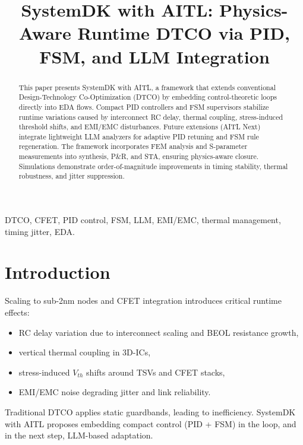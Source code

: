 \documentclass[conference]{IEEEtran}
\begin{document}
\title{SystemDK with AITL: Physics-Aware Runtime DTCO via PID, FSM, and LLM Integration}

\author{
}

\maketitle

\begin{abstract}
This paper presents SystemDK with AITL, a framework that extends conventional Design-Technology Co-Optimization (DTCO) by embedding control-theoretic loops directly into EDA flows. Compact PID controllers and FSM supervisors stabilize runtime variations caused by interconnect RC delay, thermal coupling, stress-induced threshold shifts, and EMI/EMC disturbances. Future extensions (AITL Next) integrate lightweight LLM analyzers for adaptive PID retuning and FSM rule regeneration. The framework incorporates FEM analysis and S-parameter measurements into synthesis, P\&R, and STA, ensuring physics-aware closure. Simulations demonstrate order-of-magnitude improvements in timing stability, thermal robustness, and jitter suppression.
\end{abstract}

\begin{IEEEkeywords}
DTCO, CFET, PID control, FSM, LLM, EMI/EMC, thermal management, timing jitter, EDA.
\end{IEEEkeywords}

\section{Introduction}
Scaling to sub-2nm nodes and CFET integration introduces critical runtime effects:
\begin{itemize}
  \item RC delay variation due to interconnect scaling and BEOL resistance growth,
  \item vertical thermal coupling in 3D-ICs,
  \item stress-induced $V_{th}$ shifts around TSVs and CFET stacks,
  \item EMI/EMC noise degrading jitter and link reliability.
\end{itemize}
Traditional DTCO applies static guardbands, leading to inefficiency. SystemDK with AITL proposes embedding compact control (PID + FSM) in the loop, and in the next step, LLM-based adaptation.
\end{document}

